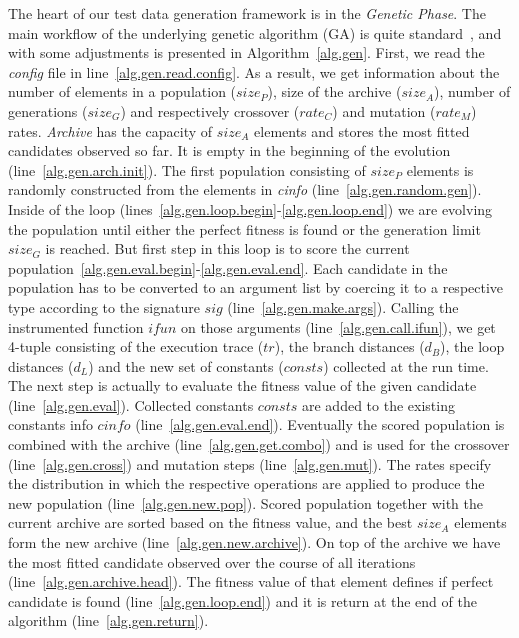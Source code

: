 \documentclass[sigconf]{acmart}
\begin{document}
The heart of our test data generation framework is in the \emph{Genetic Phase}. The main workflow of the underlying genetic algorithm (GA) is quite standard~\cite{poli2008field}, and with some adjustments is presented in Algorithm~\ref{alg.gen}. First, we read the \emph{config} file in line~\ref{alg.gen.read.config}. As a result, we get information about the number of elements in a population ($size_P$), size of the archive ($size_A$), number of generations ($size_G$) and respectively crossover ($rate_C$) and mutation ($rate_M$) rates. \emph{Archive} has the capacity of $size_A$ elements and stores the most fitted candidates observed so far. It is empty in the beginning of the evolution (line~\ref{alg.gen.arch.init}). The first population consisting of $size_P$ elements is randomly constructed from the elements in \emph{cinfo} (line~\ref{alg.gen.random.gen}). Inside of the loop (lines~\ref{alg.gen.loop.begin}-\ref{alg.gen.loop.end}) we are evolving the population until either the perfect fitness is found or the generation limit $size_G$ is reached. But first step in this loop is to score the current population~\ref{alg.gen.eval.begin}-\ref{alg.gen.eval.end}. Each candidate in the population has to be converted to an argument list by coercing it to a respective type according to the signature $sig$ (line~\ref{alg.gen.make.args}). Calling the instrumented function $ifun$ on those arguments (line~\ref{alg.gen.call.ifun}), we get 4-tuple consisting of the execution trace ($tr$), the branch distances ($d_B$), the loop distances ($d_L$) and the new set of constants ($consts$) collected at the run time. The next step is actually to evaluate the fitness value of the given candidate (line~\ref{alg.gen.eval}). Collected constants $consts$ are added to the existing constants info $cinfo$ (line~\ref{alg.gen.eval.end}). Eventually the scored population is combined with the archive (line~\ref{alg.gen.get.combo}) and is used for the crossover (line~\ref{alg.gen.cross}) and mutation steps (line~\ref{alg.gen.mut}). The rates specify the distribution in which the respective operations are applied to produce the new population (line~\ref{alg.gen.new.pop}). Scored population together with the current archive are sorted based on the fitness value, and the best $size_A$ elements form the new archive (line~\ref{alg.gen.new.archive}). On top of the archive we have the most fitted candidate observed over the course of all iterations (line~\ref{alg.gen.archive.head}). The fitness value of that element defines if perfect candidate is found (line~\ref{alg.gen.loop.end}) and it is return at the end of the algorithm (line~\ref{alg.gen.return}).
\end{document}

